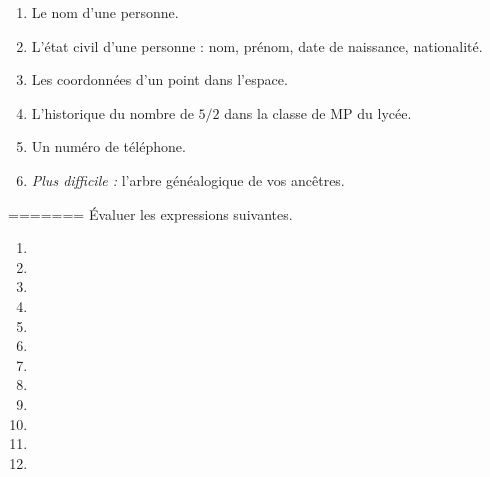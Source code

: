 \begin{enumerate}[label = \emph{\alph*)}]
  \item Le nom d'une personne.
  \item L'état civil d'une personne : nom, prénom, date de naissance, nationalité.
  \item Les coordonnées d'un point dans l'espace.
  \item L'historique du nombre de $5/2$ dans la classe de MP du lycée. 
  \item Un numéro de téléphone. 
  \item \emph{Plus difficile :} l'arbre généalogique de vos ancêtres. 
\end{enumerate}
=======
\'Evaluer les expressions suivantes.
\begin{multicols}{2}
  \begin{enumerate}[label=\emph{\alph*)}]
    \item {}
    \item {}
    \item {}
    \item {}
    \item {}
    \item {}
    \item {}
    \item {}
    \item {}
    \item {}
    \item {}
    \item {}
  \end{enumerate}
\end{multicols}

